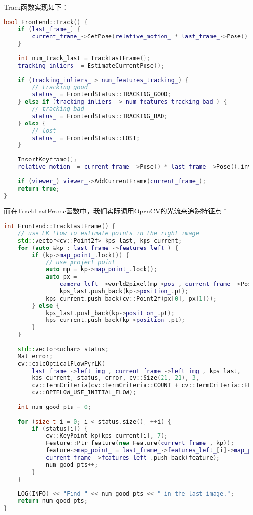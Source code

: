 Track函数实现如下：
\begin{lstlisting}[language=c++,caption=slambook2/ch13/src/frontend.cpp]
bool Frontend::Track() {
    if (last_frame_) {
        current_frame_->SetPose(relative_motion_ * last_frame_->Pose());
    }
    
    int num_track_last = TrackLastFrame();
    tracking_inliers_ = EstimateCurrentPose();
    
    if (tracking_inliers_ > num_features_tracking_) {
        // tracking good
        status_ = FrontendStatus::TRACKING_GOOD;
    } else if (tracking_inliers_ > num_features_tracking_bad_) {
        // tracking bad
        status_ = FrontendStatus::TRACKING_BAD;
    } else {
        // lost
        status_ = FrontendStatus::LOST;
    }
    
    InsertKeyframe();
    relative_motion_ = current_frame_->Pose() * last_frame_->Pose().inverse();
    
    if (viewer_) viewer_->AddCurrentFrame(current_frame_);
    return true;
}
\end{lstlisting}
而在TrackLastFrame函数中，我们实际调用OpenCV的光流来追踪特征点：
\begin{lstlisting}[language=c++,caption=slambook2/ch13/src/frontend.cpp]
int Frontend::TrackLastFrame() {
    // use LK flow to estimate points in the right image
    std::vector<cv::Point2f> kps_last, kps_current;
    for (auto &kp : last_frame_->features_left_) {
        if (kp->map_point_.lock()) {
            // use project point
            auto mp = kp->map_point_.lock();
            auto px =
                camera_left_->world2pixel(mp->pos_, current_frame_->Pose());
                kps_last.push_back(kp->position_.pt);
            kps_current.push_back(cv::Point2f(px[0], px[1]));
        } else {
            kps_last.push_back(kp->position_.pt);
            kps_current.push_back(kp->position_.pt);
        }
    }
    
    std::vector<uchar> status;
    Mat error;
    cv::calcOpticalFlowPyrLK(
        last_frame_->left_img_, current_frame_->left_img_, kps_last,
        kps_current, status, error, cv::Size(21, 21), 3,
        cv::TermCriteria(cv::TermCriteria::COUNT + cv::TermCriteria::EPS, 30, 0.01),
        cv::OPTFLOW_USE_INITIAL_FLOW);
    
    int num_good_pts = 0;
    
    for (size_t i = 0; i < status.size(); ++i) {
        if (status[i]) {
            cv::KeyPoint kp(kps_current[i], 7);
            Feature::Ptr feature(new Feature(current_frame_, kp));
            feature->map_point_ = last_frame_->features_left_[i]->map_point_;
            current_frame_->features_left_.push_back(feature);
            num_good_pts++;
        }
    }
    
    LOG(INFO) << "Find " << num_good_pts << " in the last image.";
    return num_good_pts;
}
\end{lstlisting}

